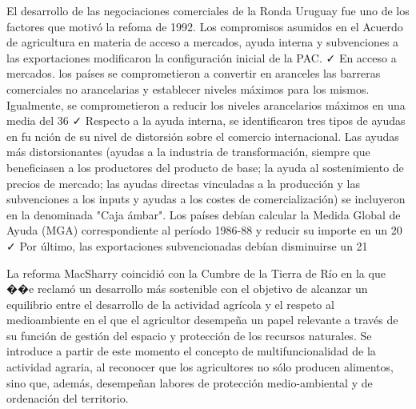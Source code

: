 \documentclass[10pt,a4paper]{article}
\begin{document}
El desarrollo de las negociaciones comerciales de la Ronda Uruguay fue uno de los factores que motivó la refoma de 1992. Los compromisos asumidos en el Acuerdo de agricultura en materia  de acceso a mercados, ayuda interna y subvenciones a las exportaciones modificaron la configuración inicial de la PAC.
✓ En acceso a mercados. los países se comprometieron a convertir en aranceles las barreras comerciales no arancelarias y establecer niveles máximos para los mismos. Igualmente, se comprometieron a reducir los niveles arancelarios máximos en una media del 36%
✓ Respecto a la ayuda interna, se identificaron tres tipos de ayudas en fu nción de su nivel de distorsión sobre el comercio internacional. Las ayudas más distorsionantes (ayudas a la industria de transformación, siempre que beneficiasen a los productores del producto de base; la ayuda al sostenimiento de precios de mercado; las ayudas directas vinculadas a la producción y las subvenciones a los inputs y ayudas a los costes de comercialización) se incluyeron en la denominada "Caja ámbar". Los países debían calcular la Medida Global de Ayuda (MGA) correspondiente al período 1986-88 y reducir su importe en un 20%
✓ Por último, las exportaciones subvencionadas debían disminuirse un 21 %

La reforma MacSharry coincidió con la Cumbre de la Tierra de Río en la que ��e reclamó un desarrollo más sostenible con el objetivo de alcanzar un equilibrio entre el desarrollo de la actividad agrícola y el respeto al medioambiente en el que el agricultor desempeña un papel relevante a través de su función de gestión del espacio y protección de los recursos naturales. Se introduce a partir de este momento el concepto de multifuncionalidad de la actividad agraria, al reconocer que los agricultores no sólo producen alimentos, sino que, además, desempeñan labores de protección medio-ambiental y de ordenación del territorio. 
\end{document}
